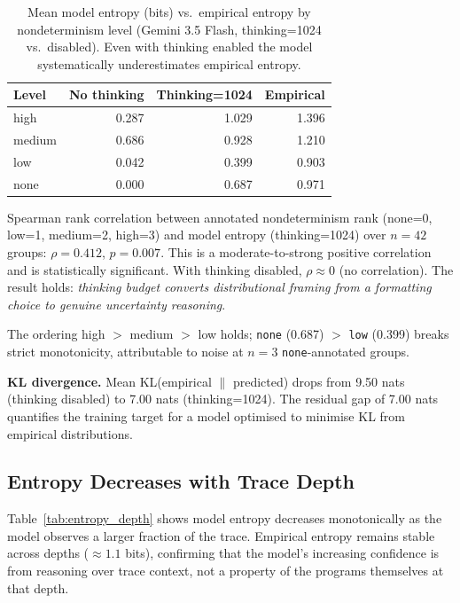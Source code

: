 \documentclass[sigconf,review,anonymous]{acmart}
\begin{document}
\begin{table}[h]
\centering
\caption{Mean model entropy (bits) vs.\ empirical entropy by nondeterminism level
(Gemini 3.5 Flash, thinking=1024 vs.\ disabled). Even with thinking enabled the
model systematically underestimates empirical entropy.}
\label{tab:model_entropy}
\begin{tabular}{lrrr}
\toprule
\textbf{Level} & \textbf{No thinking} & \textbf{Thinking=1024} & \textbf{Empirical} \\
\midrule
high   & 0.287 & 1.029 & 1.396 \\
medium & 0.686 & 0.928 & 1.210 \\
low    & 0.042 & 0.399 & 0.903 \\
none   & 0.000 & 0.687 & 0.971 \\
\bottomrule
\end{tabular}
\end{table}

Spearman rank correlation between annotated nondeterminism rank (none=0, low=1,
medium=2, high=3) and model entropy (thinking=1024) over $n{=}42$ groups:
$\rho{=}0.412$, $p{=}0.007$. This is a moderate-to-strong positive correlation
and is statistically significant. With thinking disabled, $\rho{\approx}0$ (no
correlation). The result holds: \emph{thinking budget converts distributional
framing from a formatting choice to genuine uncertainty reasoning}.

The ordering high $>$ medium $>$ low holds; \texttt{none} (0.687) $>$
\texttt{low} (0.399) breaks strict monotonicity, attributable to noise at
$n{=}3$ \texttt{none}-annotated groups.

\textbf{KL divergence.} Mean KL(empirical $\|$ predicted) drops from 9.50 nats
(thinking disabled) to 7.00 nats (thinking=1024). The residual gap of 7.00 nats
quantifies the training target for a model optimised to minimise KL from
empirical distributions.

\subsection{Entropy Decreases with Trace Depth}

Table~\ref{tab:entropy_depth} shows model entropy decreases monotonically as the
model observes a larger fraction of the trace. Empirical entropy remains stable
across depths (${\approx}1.1$ bits), confirming that the model's increasing
confidence is from reasoning over trace context, not a property of the programs
themselves at that depth.
\end{document}
